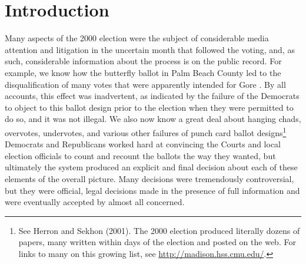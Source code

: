 \documentclass[11pt,titlepage]{article}
\begin{document}
\section{Introduction}

Many aspects of the 2000 election were the subject of considerable
media attention and litigation in the uncertain month that followed
the voting, and, as such, considerable information about the process
is on the public record.  For example, we know how the butterfly
ballot in Palm Beach County led to the disqualification of many votes
that were apparently intended for Gore
\citep{wand:schot:sekh:meba:herr:brad:01,AdaFas00}.  By all accounts,
this effect was inadvertent, as indicated by the failure of the
Democrats to object to this ballot design prior to the election when
they were permitted to do so, and it was not illegal.  We also now
know a great deal about hanging chads, overvotes, undervotes, and
various other failures of punch card ballot designs\footnote{See
  Herron and Sekhon (2001).\nocite{HerSek01} The 2000 election
  produced literally dozens of papers, many written within days of the
  election and posted on the web.  For links to many on this growing
  list, see \url{http://madison.hss.cmu.edu/}.}  Democrats and
Republicans worked hard at convincing the Courts and local election
officials to count and recount the ballots the way they wanted, but
ultimately the system produced an explicit and final decision about
each of these elements of the overall picture.  Many decisions were
tremendously controversial, but they were official, legal decisions
made in the presence of full information and were eventually accepted
by almost all concerned.
\end{document}
